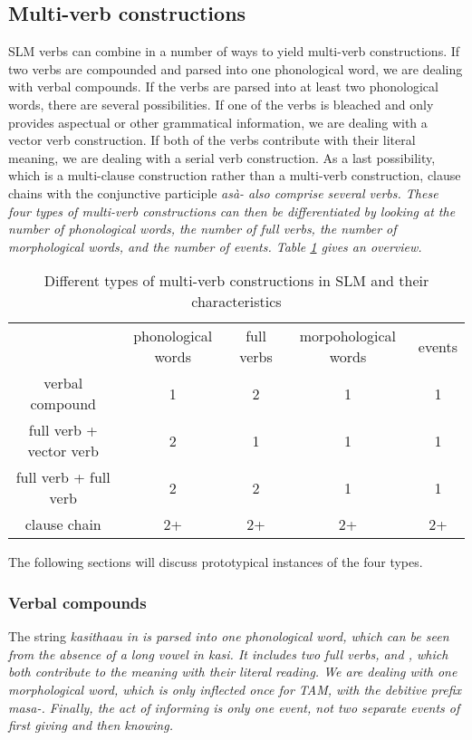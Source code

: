 \subsection{Multi-verb constructions}\label{sec:wc:Multi-verbconstructions}
SLM verbs can combine in a number of ways to yield multi-verb constructions. If two verbs are compounded and parsed into one phonological word, we are dealing with verbal compounds. If the verbs are parsed into at least two phonological words, there are several possibilities. If one of the verbs is bleached and only provides aspectual or other grammatical information, we are dealing with a vector verb construction. If  both of the verbs contribute with their literal meaning, we are dealing with a serial verb construction. As a last possibility, which is a multi-clause construction rather than a multi-verb construction, clause chains with the conjunctive participle \em asà- \em also comprise several verbs. These four types of multi-verb constructions can then be differentiated by looking at the number of phonological words, the number of full verbs, the number of morphological words, and the number of events. Table \ref{tab:form:mvc} gives an overview.

\begin{table}
\begin{center}
\begin{tabular}{ccccc}
 & phonological words & full verbs & morpohological words & events \\
verbal compound & 1 & 2 & 1 & 1 \\
full verb + vector verb & 2 & 1 & 1 & 1 \\
full verb + full verb & 2 & 2 & 1 & 1 \\
clause chain & 2+ & 2+ & 2+ & 2+
\end{tabular}
\end{center}
\caption[Different types of multi-verb constructions]{Different types of multi-verb constructions in SLM and their characteristics}
\label{tab:form:mvc}
\end{table}


The following sections will discuss prototypical instances of the four types.

\subsubsection{Verbal compounds}\label{sec:wc:mvc:Verbalcompounds}
The string \em kasithaau \em in  is parsed into one phonological word, which can be seen from the absence of a long vowel in \em kasi\em. It includes two full verbs,  and , which both contribute to the meaning with their literal reading. We are dealing with one morphological word, which is only inflected once for TAM, with the debitive prefix \em masa-\em. Finally, the act of informing is only one event, not two separate events of first giving and then knowing.

